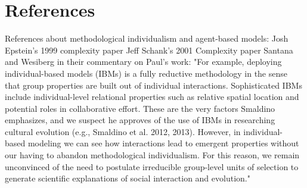 \documentclass[11pt]{article}
\begin{document}
\section{References}

References about methodological individualism and agent-based models:
Josh Epstein's 1999 complexity paper
Jeff Schank's 2001 Complexity paper
Santana and Wesiberg in their commentary on Paul's work: "For example, deploying individual-based models (IBMs) is a fully reductive methodology in the sense that group properties are built out of individual interactions. Sophisticated IBMs include individual-level relational properties such as relative spatial location and potential roles in collaborative effort. These are the very factors Smaldino emphasizes, and we suspect he approves of the use of IBMs in researching cultural evolution (e.g., Smaldino et al. 2012, 2013). However, in individual- based modeling we can see how interactions lead to emergent properties without our having to abandon methodological individualism. For this reason, we remain unconvinced of the need to postulate irreducible group-level units of selection to generate scientific explanations of social interaction and evolution."
\end{document}
